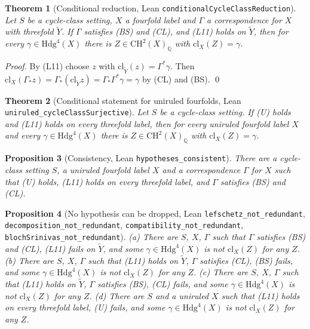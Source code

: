 \documentclass[11pt,a4paper]{article}
\newtheorem{theorem}{Theorem}
\newtheorem{proposition}[theorem]{Proposition}
\theoremstyle{definition}
\begin{document}
\begin{theorem}[Conditional reduction, Lean \texttt{conditionalCycleClassReduction}]\label{thm:reduction}
Let $S$ be a cycle-class setting, $X$ a fourfold label and $\Gamma$ a correspondence for $X$ with threefold $\tilde Y$. If $\Gamma$ satisfies (BS) and (CL), and (L11) holds on $\tilde Y$, then for every $\gamma\in\mathrm{Hdg}^4(X)$ there is $Z\in\mathrm{CH}^2(X)_{\mathbb{Q}}$ with $\mathrm{cl}_X(Z)=\gamma$.
\end{theorem}
\noindent\emph{Proof.} By (L11) choose $z$ with $\mathrm{cl}_{\tilde Y}(z)=\Gamma^*\gamma$. Then $\mathrm{cl}_X(\Gamma_*z)=\Gamma_*(\mathrm{cl}_{\tilde Y}z)=\Gamma_*\Gamma^*\gamma=\gamma$ by (CL) and (BS). \qed

\begin{theorem}[Conditional statement for uniruled fourfolds, Lean \texttt{uniruled\_cycleClassSurjective}]\label{thm:uniruled}
Let $S$ be a cycle-class setting. If (U) holds and (L11) holds on every threefold label, then for every uniruled fourfold label $X$ and every $\gamma\in\mathrm{Hdg}^4(X)$ there is $Z\in\mathrm{CH}^2(X)_{\mathbb{Q}}$ with $\mathrm{cl}_X(Z)=\gamma$.
\end{theorem}

\begin{proposition}[Consistency, Lean \texttt{hypotheses\_consistent}]\label{prop:consistent}
There are a cycle-class setting $S$, a uniruled fourfold label $X$ and a correspondence $\Gamma$ for $X$ such that (U) holds, (L11) holds on every threefold label, and $\Gamma$ satisfies (BS) and (CL).
\end{proposition}

\begin{proposition}[No hypothesis can be dropped, Lean \texttt{lefschetz\_not\_redundant}, \texttt{decomposition\_not\_redundant}, \texttt{compatibility\_not\_redundant}, \texttt{blochSrinivas\_not\_redundant}]\label{prop:independent}
(a) There are $S$, $X$, $\Gamma$ such that $\Gamma$ satisfies (BS) and (CL), (L11) fails on $\tilde Y$, and some $\gamma\in\mathrm{Hdg}^4(X)$ is not $\mathrm{cl}_X(Z)$ for any $Z$.
(b) There are $S$, $X$, $\Gamma$ such that (L11) holds on $\tilde Y$, $\Gamma$ satisfies (CL), (BS) fails, and some $\gamma\in\mathrm{Hdg}^4(X)$ is not $\mathrm{cl}_X(Z)$ for any $Z$.
(c) There are $S$, $X$, $\Gamma$ such that (L11) holds on $\tilde Y$, $\Gamma$ satisfies (BS), (CL) fails, and some $\gamma\in\mathrm{Hdg}^4(X)$ is not $\mathrm{cl}_X(Z)$ for any $Z$.
(d) There are $S$ and a uniruled $X$ such that (L11) holds on every threefold label, (U) fails, and some $\gamma\in\mathrm{Hdg}^4(X)$ is not $\mathrm{cl}_X(Z)$ for any $Z$.
\end{proposition}
\end{document}
